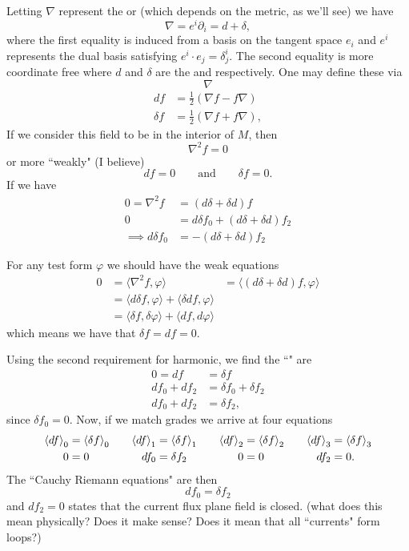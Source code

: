 Letting $\nabla$ represent the  or  (which depends on the metric, as we'll see) we have
\[
\nabla = e^i \partial_i = d + \delta,
\]
where the first equality is induced from a basis on the tangent space $e_i$ and $e^i$ represents the dual basis satisfying $e^i \cdot e_j = \delta^i_j$. The second equality is more coordinate free where $d$ and $\delta$ are the  and  respectively. One may define these via
\[
\nabla
\]
\begin{align*}
df &= \frac{1}{2}\left( \nabla f - f\nabla\right)\\
\delta f &= \frac{1}{2} \left( \nabla f + f\nabla\right),
\end{align*}
If we consider this field to be  in the interior of $M$, then
\[
\nabla^2 f =0 
\]
or more ``weakly" (I believe)
\[
d f =0 \qquad \textrm{and} \qquad \delta f = 0.
\]
If we have 
\begin{align*}
    0=\nabla^2 f &= (d\delta +\delta d) f\\
    0&= d\delta f_0 + (d\delta + \delta d)f_2\\
    \implies d\delta f_0 &= -(d\delta + \delta d)f_2
\end{align*}

For any test form $\varphi$ we should have the weak equations
\begin{align*}
    0&=\langle \nabla^2 f, \varphi\rangle &= \langle (d\delta + \delta d)f,\varphi \rangle\\
    &= \langle d \delta f, \varphi\rangle + \langle \delta d f, \varphi \rangle \\
    &= \langle \delta f, \delta \varphi \rangle + \langle df,d\varphi\rangle
\end{align*}
which means we have that $\delta f=df=0$.

Using the second requirement for harmonic, we find the ``" are
\begin{align*}
    0=df&=\delta f\\
    df_0 + df_2 &= \delta f_0 + \delta f_2\\
    df_0 + df_2 &= \delta f_2,
\end{align*}
since $\delta f_0=0$.  Now, if we match grades we arrive at four equations
\begin{align*}
    \left\langle df\right\rangle_0&=\left\langle\delta f\right\rangle_0 &&& \left\langle df\right\rangle_1&=\left\langle\delta f\right\rangle_1 &&& \left\langle df\right\rangle_2&= \left\langle\delta f\right\rangle_2 &&& \left\langle df\right\rangle_3&= \left\langle\delta f\right\rangle_3\\
    0 &= 0 &&& df_0 &= \delta f_2 &&& 0&=0 &&& df_2 &= 0.
\end{align*}
The ``Cauchy Riemann equations" are then
\[
df_0= \delta f_2
\]
and $df_2 =0$ states that the current flux plane field is closed. (what does this mean physically? Does it make sense? Does it mean that all ``currents" form loops?) 

